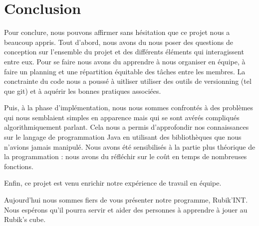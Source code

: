 \chapter*{Conclusion}

Pour conclure, nous pouvons affirmer sans hésitation que ce projet nous a beaucoup appris.
Tout d'abord, nous avons du nous poser des questions de conception sur l'ensemble du projet et des différents éléments qui interagissent entre eux.
Pour se faire nous avons du apprendre à nous organiser en équipe, à faire un planning et une répartition équitable des tâches entre les membres. 
La conctrainte du code nous a poussé à uitliser utiliser des outils de versionning (tel que git) et à aquérir les bonnes pratiques associées.

Puis, à la phase d'implémentation, nous nous sommes confrontés à des problèmes qui nous semblaient simples en apparence mais qui se sont avérés compliqués algorithmiquement parlant.
Cela nous a permis d'approfondir nos connaissances sur le langage de programmation Java en utilisant des bibliothèques que nous n'avions jamais manipulé.
Nous avons été sensibilisés à la partie plus théorique de la programmation : nous avons du réfléchir sur le coût en temps de nombreuses fonctions.


Enfin, ce projet est venu enrichir notre expérience de travail en équipe.

Aujourd'hui nous sommes fiers de vous présenter notre programme, Rubik'INT. Nous espérons qu'il pourra servir et aider des personnes à apprendre à jouer au Rubik's cube.

